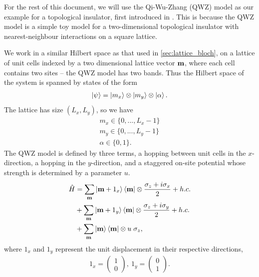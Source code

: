 
For the rest of this document, we will use the Qi-Wu-Zhang (QWZ) model as our example for a topological insulator, first introduced in \cite{qi_topological_2006}. This is because the QWZ model is a simple toy model for a two-dimensional topological insulator with nearest-neighbour interactions on a square lattice.\par
 We work in a similar Hilbert space as that used in \textsection\ref{sec:lattice_bloch}, on a lattice of unit cells indexed by a two dimensional lattice vector $\bf m$, where each cell contains two sites -- the QWZ model has two bands. Thus the Hilbert space of the system is spanned by states of the form
\begin{align}
    \ket{\psi} = \ket{m_x} \otimes \ket{m_y} \otimes \ket{\alpha}.
\end{align}
The lattice has size $(L_x,L_y)$, so we have 
\begin{align}
    m_x \in \{ 0,...,L_x-1\}\\
    m_y \in \{ 0,...,L_y-1\}\\
    \alpha \in \{0,1\}.
\end{align}
The QWZ model is defined by three terms, a hopping between unit cells in the $x$-direction, a hopping in the $y$-direction, and a staggered on-site potential whose strength is determined by a parameter $u$.
\begin{align}
    \hat H &= \sum_{\bf m} \ket{\bf m+ 1_x}\bra{\bf m} \otimes \frac{\sigma_z + i\sigma_x}{2} + h.c. \nonumber \\
    &+ \sum_{\bf m} \ket{\bf m+ 1_y}\bra{\bf m} \otimes \frac{\sigma_z + i\sigma_y}{2} + h.c. \nonumber \\
    &+ \sum_{\bf m} \ket{\bf m}\bra{\bf m} \otimes u\; \sigma_z,
\end{align}
where $1_x$ and $1_y$ represent the unit displacement in their respective directions,
\begin{align}
	1_x = \begin{pmatrix}
	1\\
	0
	\end{pmatrix}, \ 1_y = \begin{pmatrix}
	0\\
	1
	\end{pmatrix}.
\end{align}
